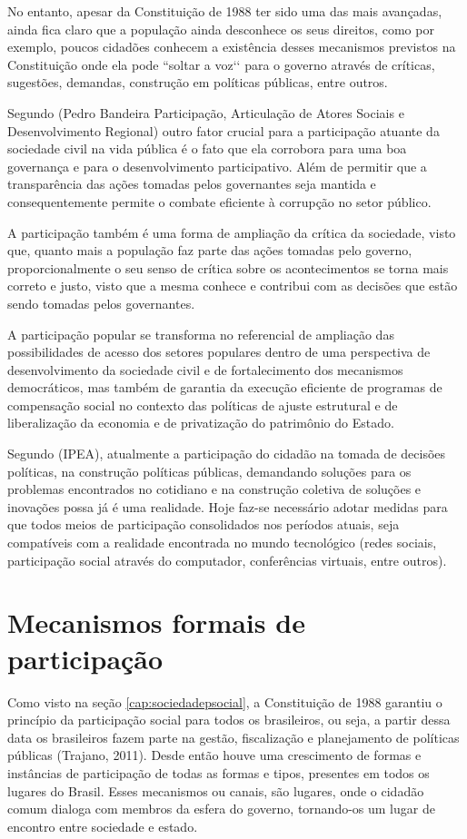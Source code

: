 No entanto, apesar da Constituição de 1988 ter sido uma das mais avançadas, ainda fica claro que a população ainda desconhece os seus direitos, como por exemplo, poucos cidadões conhecem a existência desses mecanismos previstos na Constituição onde ela pode ``soltar a voz‘‘ para o governo através de críticas, sugestões, demandas, construção em políticas públicas, entre outros. 

Segundo (Pedro Bandeira Participação, Articulação de Atores Sociais e Desenvolvimento Regional) outro fator crucial para a participação atuante da sociedade civil na vida pública é o fato que ela corrobora para uma boa governança e para o desenvolvimento participativo. Além de permitir que a transparência das ações tomadas pelos governantes seja mantida e consequentemente permite o combate eficiente à corrupção no setor público.

A participação também é uma forma de ampliação da crítica da sociedade, visto que, quanto mais a população faz parte das ações tomadas pelo governo, proporcionalmente o seu senso de crítica sobre os acontecimentos se torna mais correto e justo, visto que a mesma conhece e contribui com as decisões que estão sendo tomadas pelos governantes. 

A participação popular se transforma no referencial de ampliação das possibilidades de acesso dos setores populares dentro de uma perspectiva de desenvolvimento da sociedade civil e de fortalecimento dos mecanismos democráticos, mas também de garantia da execução eficiente de programas de compensação social no contexto das políticas de ajuste estrutural e de liberalização da economia e de privatização do patrimônio do Estado.

Segundo (IPEA), atualmente a participação do cidadão na tomada de decisões políticas, na construção políticas públicas, demandando soluções para os problemas encontrados no cotidiano e na construção coletiva de soluções e inovações possa já é uma realidade. Hoje faz-se necessário adotar medidas para que todos meios de participação consolidados nos períodos atuais, seja compatíveis com a realidade encontrada no mundo tecnológico (redes sociais, participação social através do computador, conferências virtuais, entre outros).

\section{Mecanismos formais de participação}

Como visto na seção \ref{cap:sociedadepsocial}, a Constituição de 1988 garantiu o  princípio da participação social para todos os brasileiros, ou seja, a partir dessa data os brasileiros fazem parte na gestão, fiscalização e planejamento de políticas públicas (Trajano, 2011). Desde então houve uma crescimento de formas e instâncias de participação de todas as formas e tipos, presentes em todos os lugares do Brasil. Esses mecanismos ou canais, são lugares, onde o cidadão comum dialoga com membros da esfera do governo, tornando-os um lugar de encontro entre sociedade e estado. 

